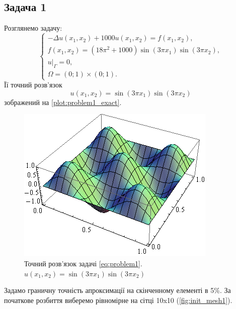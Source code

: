 
\subsection{Задача 1}

Розглянемо задачу:
\begin{equation}\label{eq:problem1}
\begin{cases}
	- \Delta u(x_1,x_2) + 1000u(x_1, x_2) = f(x_1,x_2), \\
	f(x_1,x_2) = (18 \pi^2 +1000)\sin(3 \pi x_1) \sin (3 \pi x_2), \\
	u|_\Gamma = 0 ,\\
	\Omega = \left(0;1\right) \times \left(0;1\right).
\end{cases}
\end{equation}
Її точний розв'язок
\begin{equation}
	u(x_1,x_2) = \sin(3 \pi x_1) \sin (3 \pi x_2)
\end{equation}
зображений на \autoref{plot:problem1_exact}.
\begin{figure}[H]
	\centering
    \includegraphics[scale=1.0]{problem1/ExactSolution}
    \caption{Точний розв'язок задачі \eqref{eq:problem1}. $u(x_1,x_2) = \sin(3 \pi x_1) \sin (3 \pi x_2)$}
    \label{plot:problem1_exact}
\end{figure}
Задамо граничну точність апроксимації на скінченному елементі в 5\%.
За початкове розбиття виберемо рівномірне на сітці 10x10 (\autoref{fig:init_mesh1}).
